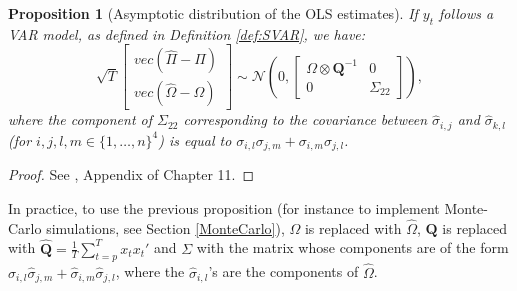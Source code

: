 \documentclass[
  12pt,
]{book}
\newtheorem{proposition}{Proposition}[chapter]
\theoremstyle{definition}
\theoremstyle{definition}
\theoremstyle{definition}
\theoremstyle{definition}
\theoremstyle{remark}
\begin{document}
\begin{proposition}[Asymptotic distribution of the OLS estimates]
\protect\hypertarget{prp:OLSVAR2}{}\label{prp:OLSVAR2}If \(y_t\) follows a VAR model, as defined in Definition \ref{def:SVAR}, we have:
\begin{equation}
\sqrt{T}\left[
\begin{array}{c}
vec(\hat\Pi - \Pi)\\
vec(\hat\Omega - \Omega)
\end{array}
\right]
\sim \mathcal{N}\left(0,
\left[
\begin{array}{cc}
\Omega \otimes \mathbf{Q}^{-1} & 0\\
0 & \Sigma_{22}
\end{array}
\right]\right),\label{eq:asymptPi}
\end{equation}
where the component of \(\Sigma_{22}\) corresponding to the covariance between \(\hat\sigma_{i,j}\) and \(\hat\sigma_{k,l}\) (for \(i,j,l,m \in \{1,\dots,n\}^4\)) is equal to \(\sigma_{i,l}\sigma_{j,m}+\sigma_{i,m}\sigma_{j,l}\).
\end{proposition}

\begin{proof}
See \citet{Hamilton_1994}, Appendix of Chapter 11.
\end{proof}

In practice, to use the previous proposition (for instance to implement Monte-Carlo simulations, see Section \ref{MonteCarlo}), \(\Omega\) is replaced with \(\hat{\Omega}\), \(\mathbf{Q}\) is replaced with \(\hat{\mathbf{Q}} = \frac{1}{T}\sum_{t=p}^T x_t x_t'\) and \(\Sigma\) with the matrix whose components are of the form \(\hat\sigma_{i,l}\hat\sigma_{j,m}+\hat\sigma_{i,m}\hat\sigma_{j,l}\), where the \(\hat\sigma_{i,l}\)'s are the components of \(\hat\Omega\).
\end{document}
